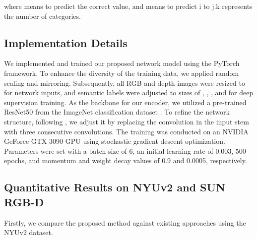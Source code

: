\documentclass{aims}
\numberwithin{equation}{section}
\begin{document}
where  means to predict the correct value, and  means to predict i to j.k represents the number of categories.
 
\subsection{Implementation Details}

We implemented and trained our proposed network model using the PyTorch framework. To enhance the diversity of the training data, we applied random scaling and mirroring. Subsequently, all RGB and depth images were resized to  for network inputs, and semantic labels were adjusted to sizes of , , , and  for deep supervision training. As the backbone for our encoder, we utilized a pre-trained ResNet50 \cite{he2016deep} from the ImageNet classification dataset \cite{russakovsky2015imagenet}. To refine the network structure, following \cite{fu2022bag, shen2021competitive, shen2022competitive},  we adjust it by replacing the  convolution in the input stem with three consecutive  convolutions. The training was conducted on an NVIDIA GeForce GTX 3090 GPU using stochastic gradient descent optimization. Parameters were set with a batch size of 6, an initial learning rate of 0.003, 500 epochs, and momentum and weight decay values of 0.9 and 0.0005, respectively.

\subsection{Quantitative Results on NYUv2 and SUN RGB-D}
Firstly, we compare the proposed method against existing approaches using the NYUv2 dataset.
\end{document}
